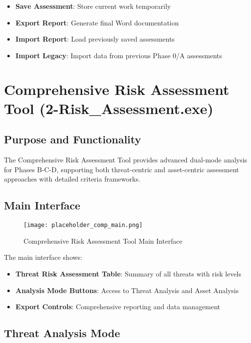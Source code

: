\documentclass[binding=0.6cm]{sapthesis}
\begin{document}
\begin{itemize}
    \item \textbf{Save Assessment}: Store current work temporarily
    \item \textbf{Export Report}: Generate final Word documentation
    \item \textbf{Import Report}: Load previously saved assessments
    \item \textbf{Import Legacy}: Import data from previous Phase 0/A assessments
\end{itemize}

\section{Comprehensive Risk Assessment Tool (2-Risk\_Assessment.exe)}

\subsection{Purpose and Functionality}

The Comprehensive Risk Assessment Tool provides advanced dual-mode analysis for Phases B-C-D, supporting both threat-centric and asset-centric assessment approaches with detailed criteria frameworks.

\subsection{Main Interface}

\begin{figure}[H]
    \centering
    \texttt{[image: placeholder\_comp\_main.png]}
    \caption{Comprehensive Risk Assessment Tool Main Interface}
    \label{fig:comp_main}
\end{figure}

The main interface shows:
\begin{itemize}
    \item \textbf{Threat Risk Assessment Table}: Summary of all threats with risk levels
    \item \textbf{Analysis Mode Buttons}: Access to Threat Analysis and Asset Analysis
    \item \textbf{Export Controls}: Comprehensive reporting and data management
\end{itemize}

\subsection{Threat Analysis Mode}
\end{document}
